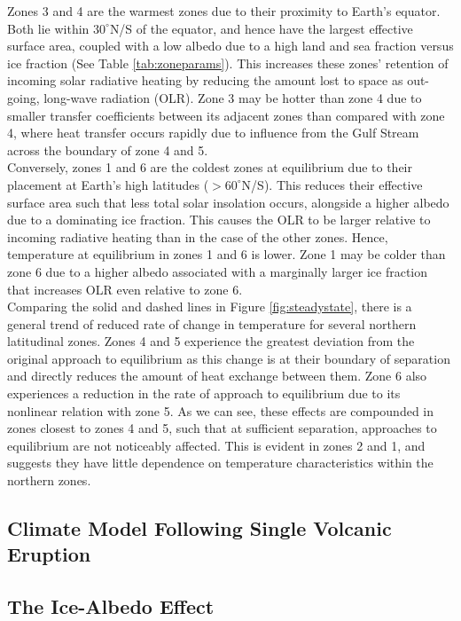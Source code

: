\documentclass[12pt]{article}
\begin{document}
Zones 3 and 4 are the warmest zones due to their proximity to Earth's equator.
Both lie within $30^{\circ}$N/S of the equator, and hence have the largest
effective surface area, coupled with a low albedo due to a high land and sea
fraction versus ice fraction (See Table \ref{tab:zoneparams}). This increases
these zones' retention of incoming solar radiative heating by reducing the
amount lost to space as out-going, long-wave radiation (OLR). Zone 3 may be
hotter than zone 4 due to smaller transfer coefficients between its adjacent
zones than compared with zone 4, where heat transfer occurs rapidly due to
influence from the Gulf Stream across the boundary of zone 4 and 5. \\

Conversely, zones 1 and 6 are the coldest zones at equilibrium due to their
placement at Earth's high latitudes ($>60^{\circ}$N/S). This reduces their
effective surface area such that less total solar insolation occurs, alongside
a higher albedo due to a dominating ice fraction. This causes the OLR to be
larger relative to incoming radiative heating than in the case of the other
zones. Hence, temperature at equilibrium in zones 1 and 6 is lower. Zone 1 may
be colder than zone 6 due to a higher albedo associated with a marginally larger
ice fraction that increases OLR even relative to zone 6. \\

Comparing the solid and dashed lines in Figure \ref{fig:steadystate}, there is a
general trend of reduced rate of change in temperature for several northern 
latitudinal zones. Zones 4 and 5 experience the greatest deviation from the
original approach to equilibrium as this change is at their boundary of
separation and directly reduces the amount of heat exchange between them.
Zone 6 also experiences a reduction in the rate of approach to equilibrium due
to its nonlinear relation with zone 5. As we can see, these effects are
compounded in zones closest to zones 4 and 5, such that at sufficient
separation, approaches to equilibrium are not noticeably affected. This is
evident in zones 2 and 1, and suggests they have little dependence on
temperature characteristics within the northern zones. 

\subsection{Climate Model Following Single Volcanic Eruption}
\subsection{The Ice-Albedo Effect}
\end{document}

